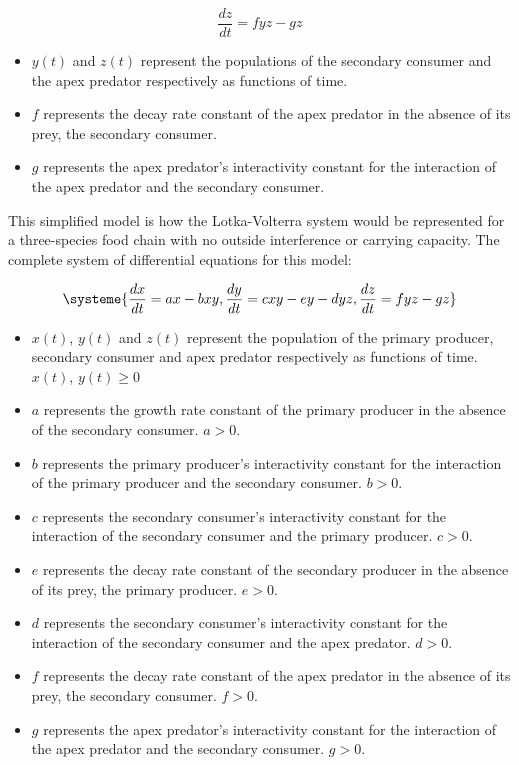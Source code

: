 \documentclass[11pt,oneside]{article}
\begin{document}
	\begin{equation}
	\frac{dz}{dt} = fyz - gz
	\end{equation}
	\begin{itemize}
		\item $y(t)$ and $z(t)$ represent the populations of the secondary consumer and the apex predator respectively as functions of time.
		\item $f$ represents the decay rate constant of the apex predator in the absence of its prey, the secondary consumer.
		\item $g$ represents the apex predator's interactivity constant for the interaction of the apex predator and the secondary consumer.
	\end{itemize}
	
	This simplified model is how the Lotka-Volterra system would be represented for a three-species food chain with no outside interference or carrying capacity. The complete system of differential equations for this model:
	
	\begin{equation}
	\systeme{
		\frac{dx}{dt} = ax - bxy,
		\frac{dy}{dt} = cxy - ey -dyz,
		\frac{dz}{dt} = fyz - gz
	}
	\end{equation}
	\begin{itemize}
		\item $x(t)$, $y(t)$ and $z(t)$ represent the population of the primary producer, secondary consumer and apex predator respectively as functions of time. $x(t)$, $y(t) \geq 0$
		\item $a$ represents the growth rate constant of the primary producer in the absence of the secondary consumer. $a > 0$.
		\item $b$ represents the primary producer's interactivity constant for the interaction of the primary producer and the secondary consumer. $b > 0$.
		\item $c$ represents the secondary consumer's interactivity constant for the interaction of the secondary consumer and the primary producer. $c > 0$.
		\item $e$ represents the decay rate constant of the secondary producer in the absence of its prey, the primary producer. $e > 0$.
		\item $d$ represents the secondary consumer's interactivity constant for the interaction of the secondary consumer and the apex predator. $d > 0$.
		\item $f$ represents the decay rate constant of the apex predator in the absence of its prey, the secondary consumer. $f > 0$.
		\item $g$ represents the apex predator's interactivity constant for the interaction of the apex predator and the secondary consumer. $g > 0$.
	\end{itemize}
	
\end{document}
